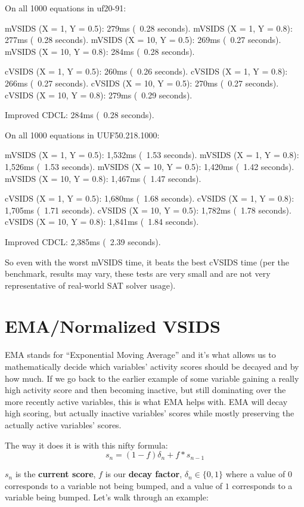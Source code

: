 \begin{FVerbatim}
On all 1000 equations in uf20-91:

mVSIDS (X = 1, Y = 0.5):    279ms (~0.28 seconds).
mVSIDS (X = 1, Y = 0.8):    277ms (~0.28 seconds).
mVSIDS (X = 10, Y = 0.5):   269ms (~0.27 seconds).
mVSIDS (X = 10, Y = 0.8):   284ms (~0.28 seconds).

cVSIDS (X = 1, Y = 0.5):    260ms (~0.26 seconds).
cVSIDS (X = 1, Y = 0.8):    266ms (~0.27 seconds).
cVSIDS (X = 10, Y = 0.5):   270ms (~0.27 seconds).
cVSIDS (X = 10, Y = 0.8):   279ms (~0.29 seconds).

Improved CDCL:              284ms (~0.28 seconds).

On all 1000 equations in UUF50.218.1000:

mVSIDS (X = 1, Y = 0.5):    1,532ms (~1.53 seconds).
mVSIDS (X = 1, Y = 0.8):    1,526ms (~1.53 seconds).
mVSIDS (X = 10, Y = 0.5):   1,420ms (~1.42 seconds).
mVSIDS (X = 10, Y = 0.8):   1,467ms (~1.47 seconds).

cVSIDS (X = 1, Y = 0.5):    1,680ms (~1.68 seconds).
cVSIDS (X = 1, Y = 0.8):    1,705ms (~1.71 seconds).
cVSIDS (X = 10, Y = 0.5):   1,782ms (~1.78 seconds).
cVSIDS (X = 10, Y = 0.8):   1,841ms (~1.84 seconds).

Improved CDCL:              2,385ms (~2.39 seconds).
\end{FVerbatim}
\noindent
So even with the worst mVSIDS time, it beats the best cVSIDS time
(per the benchmark, results may vary, these tests are very small and are not 
very representative of real-world SAT solver usage).

\section{EMA/Normalized VSIDS}

EMA stands for ``Exponential Moving Average'' and it's what allows us to 
mathematically decide which variables' activity scores should be decayed 
and by how much. If we go back to the earlier example of some variable gaining 
a really high activity score and then becoming inactive, but still dominating 
over the more recently active variables, this is what EMA helps with. EMA will 
decay high scoring, but actually inactive variables' scores while mostly 
preserving the actually active variables' scores. 

The way it does it is with this nifty formula:
$$s_n = (1 - f)\delta_n + f * s_{n - 1}$$

$s_n$ is the \textbf{current score}, $f$ is our \textbf{decay factor},
$\delta_n \in \{0, 1\}$ where a value of $0$ corresponds to a variable 
not being bumped, and a value of $1$ corresponds to a variable being bumped.
Let's walk through an example:

